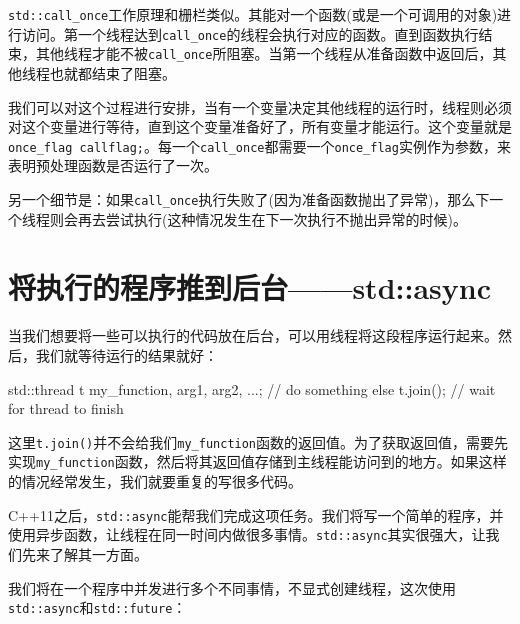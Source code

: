 
\texttt{std::call\_once}工作原理和栅栏类似。其能对一个函数(或是一个可调用的对象)进行访问。第一个线程达到\texttt{call\_once}的线程会执行对应的函数。直到函数执行结束，其他线程才能不被\texttt{call\_once}所阻塞。当第一个线程从准备函数中返回后，其他线程也就都结束了阻塞。

我们可以对这个过程进行安排，当有一个变量决定其他线程的运行时，线程则必须对这个变量进行等待，直到这个变量准备好了，所有变量才能运行。这个变量就是\texttt{once\_flag callflag;}。每一个\texttt{call\_once}都需要一个\texttt{once\_flag}实例作为参数，来表明预处理函数是否运行了一次。

另一个细节是：如果\texttt{call\_once}执行失败了(因为准备函数抛出了异常)，那么下一个线程则会再去尝试执行(这种情况发生在下一次执行不抛出异常的时候)。


\section{将执行的程序推到后台——std::async}

当我们想要将一些可以执行的代码放在后台，可以用线程将这段程序运行起来。然后，我们就等待运行的结果就好：

\begin{codebox}[cpp]
std::thread t {my_function, arg1, arg2, ...};
// do something else
t.join(); // wait for thread to finish
\end{codebox}

这里\texttt{t.join()}并不会给我们\texttt{my\_function}函数的返回值。为了获取返回值，需要先实现\texttt{my\_function}函数，然后将其返回值存储到主线程能访问到的地方。如果这样的情况经常发生，我们就要重复的写很多代码。

C++11之后，\texttt{std::async}能帮我们完成这项任务。我们将写一个简单的程序，并使用异步函数，让线程在同一时间内做很多事情。\texttt{std::async}其实很强大，让我们先来了解其一方面。


我们将在一个程序中并发进行多个不同事情，不显式创建线程，这次使用\texttt{std::async}和\texttt{std::future}：

